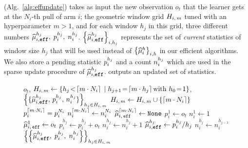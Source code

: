 \EFF (Alg.~\ref{alg:effupdate}) takes as input the new observation $o_t$ that the learner gets at the $N_i$-th pull of arm $i$; the geometric window grid $H_{i,\,m}$ tuned with an hyperparameter $m>1$, and for each window $h_j$ in this grid, three different numbers $\widehat{\mu}_{i,\texttt{\footnotesize{eff}}}^{h_j},\; p_i^{h_j}, \; n_i^{h_j}$. $\left\{\widehat{\mu}_{i,\texttt{\footnotesize{eff}}}^{h_j}\right\}_{i,h_j}$ represents the set of \emph{current} statistics of window size $h_j$ that will be used instead of $\left\{\widehat{\mu}_i^h\right\}_{i,h}$ in our efficient algorithms. We also store a pending statistic $p_i^{h_j}$ and a count $n_i^{h_j}$  which are used in the sparse update procedure of $\widehat{\mu}_{i,\texttt{\footnotesize{eff}}}^{h_j}$. \EFF outputs an updated set of statistics.  
\begin{figure}[!ht]
\begin{minipage}{\textwidth}
\renewcommand*\footnoterule{}
\begin{savenotes}
\begin{algorithm}[H]
\caption{\EFF}
\label{alg:effupdate}
\begin{algorithmic}[1]
\Require $o_t$, \small $H_{i,\,m} \gets \left\{h_j \! <\! \left\lceil m \cdot N_i\right\rceil \; | \;  h_{j+1} \!=\! \left\lceil m \cdot h_j\right\rceil  \text{with } h_0 \!=\! 1\right\} $\normalsize, $\left\{ \{ \widehat{\mu}_{i,\texttt{\footnotesize{eff}}}^{h_j},\, p_i^{h_j}, \, n_i^{h_j} \}\right\}_{h_j \in H_{i,\,m}}$
\label{algline:effu-new-condition}   
\State $H_{i,\,m} \gets H_{i,\,m} \cup \left\{ \left\lceil m \cdot N_i\right\rceil \right\}$\label{algline:effu-new-h}
\State $p_i^{\left\lceil m \cdot N_i\right\rceil } = p_i^{N_i} $\label{algline:effu-new-p}
\State $n_i^{\left\lceil m \cdot N_i\right\rceil } \gets n_i^{N_i} $\label{algline:effu-new-n}
\State $\widehat{\mu}_{i, \, \normalfont{\texttt{eff}}}^{\left\lceil m \cdot N_i\right\rceil }\leftarrow \texttt{None}$\label{algline:effu-new-mu}
\EndIf\label{algline:effu-new-end} 
\State $p_i^{1} \gets o_t$ \label{algline:effu-update-first-p} 
\State $n_i^{1} \gets 1$\label{algline:effu-update-first-n}
\State $\widehat{\mu}_{i, \, \normalfont{\texttt{eff}}}^{1}\leftarrow o_t$ \label{algline:effu-update-first-hmu}
\label{algline:effu-update-start} 
\State $p_i^{h_j} \gets p_i^{h_j}  +o_t$\label{algline:effu-update-p}
\State $n_i^{h_j} \gets n_i^{h_j} + 1$\label{algline:effu-update-n}
\EndFor\label{algline:effu-update-end} 
\label{algline:effu-refresh-start}
 \label{algline:effu-refresh-condition}
\State $\widehat{\mu}_{i,\texttt{\footnotesize{eff}}}^{h_j} \leftarrow p_i^{h_j}/h_j$ \label{algline:effu-refresh-hmu}
 \label{algline:effu-refresh-p}
\State $n_i^{h_{j}} \gets n_i^{h_{j-1}} $\label{algline:effu-refresh-n}
\EndIf
\EndFor \label{algline:effu-refresh-end}
\Ensure $\left\{\left\{  \widehat{\mu}_{i,\texttt{\footnotesize{eff}}}^{h_j},\; p_i^{h_j}, \; n_i^{h_j} \right\}\right\}_{h_j \in H_{i,\,m}}$
\end{algorithmic}
\end{algorithm}
\end{savenotes}
\end{minipage}
\end{figure}
